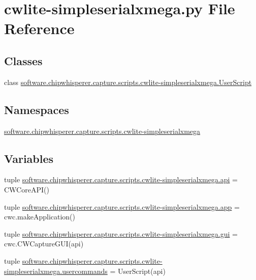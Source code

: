 \hypertarget{cwlite-simpleserialxmega_8py}{}\section{cwlite-\/simpleserialxmega.py File Reference}
\label{cwlite-simpleserialxmega_8py}
\subsection*{Classes}
\begin{DoxyCompactItemize}
\item 
class \hyperlink{classsoftware_1_1chipwhisperer_1_1capture_1_1scripts_1_1cwlite-simpleserialxmega_1_1UserScript}{software.\+chipwhisperer.\+capture.\+scripts.\+cwlite-\/simpleserialxmega.\+User\+Script}
\end{DoxyCompactItemize}
\subsection*{Namespaces}
\begin{DoxyCompactItemize}
\item 
 \hyperlink{namespacesoftware_1_1chipwhisperer_1_1capture_1_1scripts_1_1cwlite-simpleserialxmega}{software.\+chipwhisperer.\+capture.\+scripts.\+cwlite-\/simpleserialxmega}
\end{DoxyCompactItemize}
\subsection*{Variables}
\begin{DoxyCompactItemize}
\item 
tuple \hyperlink{namespacesoftware_1_1chipwhisperer_1_1capture_1_1scripts_1_1cwlite-simpleserialxmega_ad9f99e430f83981fab58150708526ef5}{software.\+chipwhisperer.\+capture.\+scripts.\+cwlite-\/simpleserialxmega.\+api} = C\+W\+Core\+A\+P\+I()
\item 
tuple \hyperlink{namespacesoftware_1_1chipwhisperer_1_1capture_1_1scripts_1_1cwlite-simpleserialxmega_a84c59aaa55025331155121f2a0fb8320}{software.\+chipwhisperer.\+capture.\+scripts.\+cwlite-\/simpleserialxmega.\+app} = cwc.\+make\+Application()
\item 
tuple \hyperlink{namespacesoftware_1_1chipwhisperer_1_1capture_1_1scripts_1_1cwlite-simpleserialxmega_ac8850b2029a5965ef8a73182cec204c3}{software.\+chipwhisperer.\+capture.\+scripts.\+cwlite-\/simpleserialxmega.\+gui} = cwc.\+C\+W\+Capture\+G\+U\+I(api)
\item 
tuple \hyperlink{namespacesoftware_1_1chipwhisperer_1_1capture_1_1scripts_1_1cwlite-simpleserialxmega_aab8230f44c5781d759173502a821b5a2}{software.\+chipwhisperer.\+capture.\+scripts.\+cwlite-\/simpleserialxmega.\+usercommands} = User\+Script(api)
\end{DoxyCompactItemize}
